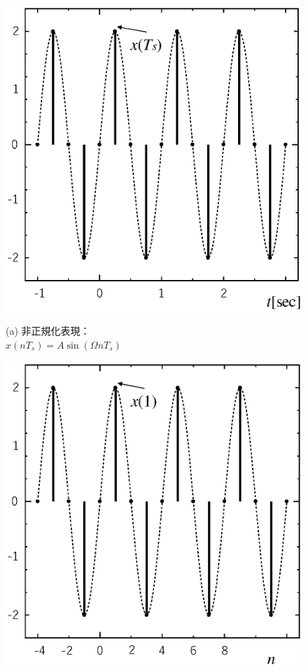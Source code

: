 \begin{figure}[H]
\begin{center}
\begin{minipage}{.4\textwidth}
\begin{center}
\includegraphics[width=.95\textwidth]{fig/zu-1-5-a.eps}

(a) 非正規化表現：\\ $x(nT_s)=A \sin (\Omega n T_s)$
\end{center}
\end{minipage}
\begin{minipage}{.4\textwidth}
\begin{center}
\includegraphics[width=.95\textwidth]{fig/zu-1-5-b.eps}


\end{center}
\end{minipage}
\end{center}
\end{figure}
